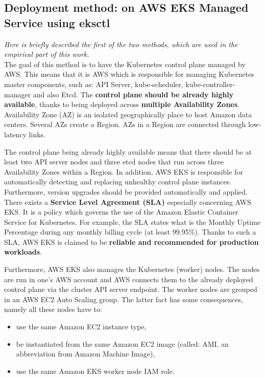 \subsection{Deployment method: on AWS EKS Managed Service using eksctl}
\textit{Here is briefly described the first of the two methods, which are used in the empirical part of this work.}
\\

The goal of this method is to have the Kubernetes control plane managed by AWS. This means that it is AWS which is responsible for managing Kubernetes master components, such as: API Server, kube-scheduler, kube-controller-manager and also Etcd. The \textbf{control plane should be already highly available}, thanks to being deployed across \textbf{multiple Availability Zones}\cite{what-is-eks}. Availability Zone (AZ) is an isolated geographically place to host Amazon data centers. Several AZs create a Region. AZs in a Region are connected through low-latency links\cite{az}.

The control plane being already highly available means that there should be at least two API server nodes and three etcd nodes that run across three Availability Zones within a Region. In addition, AWS EKS is responsible for automatically detecting and replacing unhealthy control plane instances. Furthermore, version upgrades should be provided automatically and applied\cite{what-is-eks}. There exists a \textbf{Service Level Agreement (SLA)} especially concerning AWS EKS. It is a policy which governs the use of the Amazon Elastic Container Service for Kubernetes. For example, the SLA states what is the Monthly Uptime Percentage during any monthly billing cycle (at least 99.95\%)\cite{eks-sla}. Thanks to such a SLA, AWS EKS is claimed to be \textbf{reliable and recommended for production workloads}\cite{what-is-eks}.

Furthermore, AWS EKS also manages the Kubernetes (worker) nodes. The nodes are run in one's AWS account and AWS connects them to the already deployed control plane via the cluster API server endpoint. The worker nodes are grouped in an AWS EC2 Auto Scaling group. The latter fact has some consequences, namely all these nodes have to\cite{eks-worker}:
\begin{itemize}
\item use the same Amazon EC2 instance type,
\item be instantiated from the same Amazon EC2 image (called: AMI, an abbreviation from Amazon Machine Image\cite{aws-ami}),
\item use the same Amazon EKS worker node IAM role.
\end{itemize}

